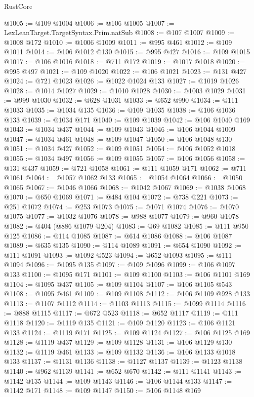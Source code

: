 \begin{lexlean}{RustCore}
\begin{coremodule}
@1005 := @109 @1004
@1006 := @106 @1005
@1007 := LexLeanTarget.TargetSyntax.Prim.natSub
@1008 := @107 @1007
@1009 := @1008 @172
@1010 := @1006 @1009
@1011 := @995 @461
@1012 := @109 @1011
@1014 := @106 @1012 @130
@1015 := @995 @427
@1016 := @109 @1015
@1017 := @106 @1016
@1018 := @711 @172
@1019 := @1017 @1018
@1020 := @995 @497
@1021 := @109 @1020
@1022 := @106 @1021
@1023 := @131 @427
@1024 := @721 @1023
@1026 := @1022 @1024 @133
@1027 := @1019 @1026
@1028 := @1014 @1027
@1029 := @1010 @1028
@1030 := @1003 @1029
@1031 := @999 @1030
@1032 := @628 @1031
@1033 := @652 @990
@1034 := @111 @1033
@1035 := @1034 @135
@1036 := @109 @1035
@1038 := @106 @1036 @133
@1039 := @1034 @171
@1040 := @109 @1039
@1042 := @106 @1040 @169
@1043 := @1034 @437
@1044 := @109 @1043
@1046 := @106 @1044 @1009
@1047 := @1034 @461
@1048 := @109 @1047
@1050 := @106 @1048 @130
@1051 := @1034 @427
@1052 := @109 @1051
@1054 := @106 @1052 @1018
@1055 := @1034 @497
@1056 := @109 @1055
@1057 := @106 @1056
@1058 := @131 @437
@1059 := @721 @1058
@1061 := @111 @1059 @171
@1062 := @711 @1061
@1064 := @1057 @1062 @133
@1065 := @1054 @1064
@1066 := @1050 @1065
@1067 := @1046 @1066
@1068 := @1042 @1067
@1069 := @1038 @1068
@1070 := @650 @1069
@1071 := @484 @104
@1072 := @738 @221
@1073 := @251 @1072
@1074 := @253 @1073
@1075 := @1071 @1074
@1076 := @1070 @1075
@1077 := @1032 @1076
@1078 := @988 @1077
@1079 := @960 @1078
@1082 := @404 (@886 @1079 @204)
@1083 := @69 @1082
@1085 := @111 @950 @125
@1086 := @114 @1085
@1087 := @614 @1086
@1088 := @106 @1087
@1089 := @635 @135
@1090 := @114 @1089
@1091 := @654 @1090
@1092 := @111 @1091
@1093 := @1092 @523
@1094 := @652 @1093
@1095 := @111 @1094
@1096 := @1095 @135
@1097 := @109 @1096
@1099 := @106 @1097 @133
@1100 := @1095 @171
@1101 := @109 @1100
@1103 := @106 @1101 @169
@1104 := @1095 @437
@1105 := @109 @1104
@1107 := @106 @1105 @543
@1108 := @1095 @461
@1109 := @109 @1108
@1112 := @106 @1109 @928 @133
@1113 := @1107 @1112
@1114 := @1103 @1113
@1115 := @1099 @1114
@1116 := @888 @1115
@1117 := @672 @523
@1118 := @652 @1117
@1119 := @111 @1118
@1120 := @1119 @135
@1121 := @109 @1120
@1123 := @106 @1121 @133
@1124 := @1119 @171
@1125 := @109 @1124
@1127 := @106 @1125 @169
@1128 := @1119 @437
@1129 := @109 @1128
@1131 := @106 @1129 @130
@1132 := @1119 @461
@1133 := @109 @1132
@1136 := @106 @1133 @1018 @133
@1137 := @1131 @1136
@1138 := @1127 @1137
@1139 := @1123 @1138
@1140 := @962 @1139
@1141 := @652 @670
@1142 := @111 @1141
@1143 := @1142 @135
@1144 := @109 @1143
@1146 := @106 @1144 @133
@1147 := @1142 @171
@1148 := @109 @1147
@1150 := @106 @1148 @169

\end{coremodule}
\end{lexlean}
